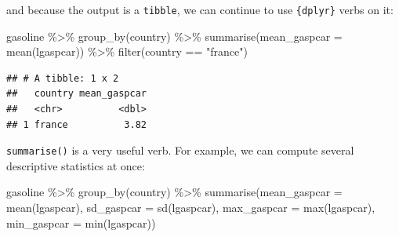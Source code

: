 \documentclass[
]{article}
\newenvironment{Shaded}{\begin{snugshade}}{\end{snugshade}}
\newcommand{\AttributeTok}[1]{\textcolor[rgb]{0.77,0.63,0.00}{#1}}
\newcommand{\FunctionTok}[1]{\textcolor[rgb]{0.00,0.00,0.00}{#1}}
\newcommand{\NormalTok}[1]{#1}
\newcommand{\SpecialCharTok}[1]{\textcolor[rgb]{0.00,0.00,0.00}{#1}}
\newcommand{\StringTok}[1]{\textcolor[rgb]{0.31,0.60,0.02}{#1}}
\begin{document}
and because the output is a \texttt{tibble}, we can continue to use \texttt{\{dplyr\}} verbs on it:

\begin{Shaded}
\begin{Highlighting}[]
\NormalTok{gasoline }\SpecialCharTok{\%\textgreater{}\%}
  \FunctionTok{group\_by}\NormalTok{(country) }\SpecialCharTok{\%\textgreater{}\%}
  \FunctionTok{summarise}\NormalTok{(}\AttributeTok{mean\_gaspcar =} \FunctionTok{mean}\NormalTok{(lgaspcar)) }\SpecialCharTok{\%\textgreater{}\%}
  \FunctionTok{filter}\NormalTok{(country }\SpecialCharTok{==} \StringTok{"france"}\NormalTok{)}
\end{Highlighting}
\end{Shaded}

\begin{verbatim}
## # A tibble: 1 x 2
##   country mean_gaspcar
##   <chr>          <dbl>
## 1 france          3.82
\end{verbatim}

\texttt{summarise()} is a very useful verb. For example, we can compute several descriptive statistics at once:

\begin{Shaded}
\begin{Highlighting}[]
\NormalTok{gasoline }\SpecialCharTok{\%\textgreater{}\%}
  \FunctionTok{group\_by}\NormalTok{(country) }\SpecialCharTok{\%\textgreater{}\%}
  \FunctionTok{summarise}\NormalTok{(}\AttributeTok{mean\_gaspcar =} \FunctionTok{mean}\NormalTok{(lgaspcar),}
            \AttributeTok{sd\_gaspcar =} \FunctionTok{sd}\NormalTok{(lgaspcar),}
            \AttributeTok{max\_gaspcar =} \FunctionTok{max}\NormalTok{(lgaspcar),}
            \AttributeTok{min\_gaspcar =} \FunctionTok{min}\NormalTok{(lgaspcar))}
\end{Highlighting}
\end{Shaded}
\end{document}
